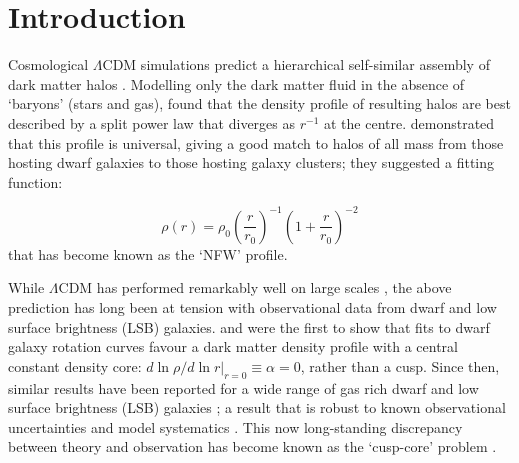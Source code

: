 \section{Introduction}\label{sec:introduction}


Cosmological $\Lambda$CDM simulations predict a hierarchical
self-similar assembly of dark matter halos
\citep[e.g.][]{WhiteRees1978, NavarroFrenkWhite1996}. Modelling only
the dark matter fluid in the absence of `baryons' (stars and gas),
\citet{DubinskiCarlberg1991} found that the density profile of
resulting halos are best described by a split power law that diverges
as $r^{-1}$ at the centre. \citet{NavarroFrenkWhite1996} demonstrated
that this profile is universal, giving a good match to
halos of all mass from those hosting dwarf galaxies to those hosting
galaxy clusters; they suggested a fitting function:

\begin{equation}
    \rho(r) = \rho_0 \left(\frac{r}{r_0}\right)^{-1}\left(1 + \frac{r}{r_0}\right)^{-2}
    \label{eqn:nfw}
\end{equation}
that has become known as the `NFW' profile.

While $\Lambda$CDM has performed remarkably well on large scales
\citep[e.g.][]{2002PhRvD..66j3508T}, the above prediction has long been at
tension with observational data from dwarf and low surface brightness (LSB)
galaxies. \citet{FloresPrimack1994} and \citet{Moore1994} were the first to show
that fits to dwarf galaxy rotation curves favour a dark matter density profile
with a central constant density core: $\left. d\ln \rho / d\ln r\right|_{r=0}
\equiv \alpha = 0$, rather than a cusp. Since then, similar results have been
reported for a wide range of gas rich dwarf and low surface brightness (LSB)
galaxies \citep[e.g.][]{DeBlok+2001, McGaugh+2001, DeBlok+2008,
  HagueWilkinson2014}; a result that is robust to known observational
uncertainties and model systematics
\citep[e.g.][]{KuzioDeNarayKaufmann2011}. This now long-standing discrepancy
between theory and observation has become known as the `cusp-core' problem
\citep[for a review see e.g.][]{DeBlok2010}.

